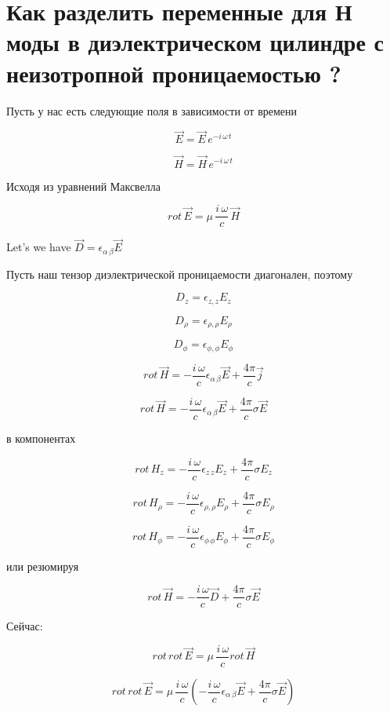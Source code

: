 \documentclass{article}
\begin{document}
\section{Как разделить переменные для Н моды в диэлектрическом цилиндре с неизотропной проницаемостью ?}


Пусть у нас есть следующие поля в зависимости от времени

$$\vec{E} = \vec{E}\,e^{-i\,\omega\,t}$$

$$\vec{H} = \vec{H}\,e^{-i\,\omega\,t}$$

Исходя из уравнений Максвелла

$$rot\,\vec{E} = \mu\,\frac{i\,\omega}{c}\,\vec{H}$$

Let's we have $\vec D = \epsilon_{\alpha\,\beta} \vec{E}$

Пусть наш тензор диэлектрической проницаемости диагонален, поэтому

$$D_{z} = \epsilon_{z,z} {E}_z$$

$$D_{\rho} = \epsilon_{\rho, \rho} {E}_\rho$$

$$D_{\phi} = \epsilon_{\phi, \phi} {E}_\phi$$

$$rot\,\vec{H} = - \frac{i\,\omega}{c} \epsilon_{\alpha\,\beta} \vec{E} + \frac{4\pi}{c}\vec{j}$$

$$rot\,\vec{H} = - \frac{i\,\omega}{c} \epsilon_{\alpha\,\beta} \vec{E} + \frac{4\pi}{c} \sigma \vec{E}$$

в компонентах

$$rot\,{H}_{z} = - \frac{i\,\omega}{c} \epsilon_{z\,z} {E}_{z} + \frac{4\pi}{c} \sigma {E}_{z}$$

$$rot\,{H}_{\rho} = - \frac{i\,\omega}{c} \epsilon_{\rho,\rho} {E}_{\rho} + \frac{4\pi}{c} \sigma {E}_{\rho}$$

$$rot\,{H}_{\phi} = - \frac{i\,\omega}{c} \epsilon_{\phi\,\phi} {E}_{\phi}+ \frac{4\pi}{c} \sigma {E}_{\phi}$$

или резюмируя

$$rot\,\vec{H} = - \frac{i\,\omega}{c} \vec{D} + \frac{4\pi}{c} \sigma \vec{E}$$

Сейчас:

$$rot\,rot\,\vec{E} = \mu\,\frac{i\,\omega}{c}rot\,\vec{H}$$

$$rot\,rot\,\vec{E} = \mu\,\frac{i\,\omega}{c}\left(-\frac{i\,\omega}{c}{\epsilon}_{\alpha\,\beta}\vec{E} + \frac{4\pi}{c}\sigma\vec{E}\right)$$
\end{document}
